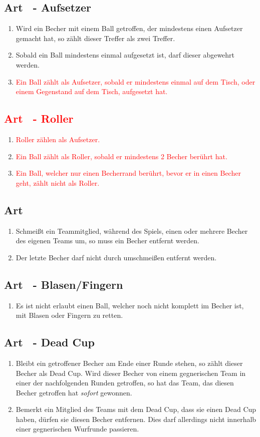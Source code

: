\documentclass[a4paper,11pt]{scrartcl}
\newcommand{\enum}[1]{\begin{enumerate}[label=(\arabic*)]#1\end{enumerate}}
\newcommand{\art}[2]{\subsection*{#1} \enum{#2}}
\newcommand{\quot}[1]{\glqq #1\grqq}
\newcommand{\new}[1]{\textcolor{red}{#1}}
\newcounter{art}
\begin{document}
    \art{Art \theart\ - Aufsetzer}{
        \item
            Wird ein Becher mit einem Ball getroffen, der mindestens einen Aufsetzer gemacht hat, so zählt dieser Treffer als zwei Treffer.
        \item
            Sobald ein Ball mindestens einmal aufgesetzt ist, darf dieser abgewehrt werden.
        \item
            \new{Ein Ball zählt als Aufsetzer, sobald er mindestens einmal auf dem Tisch, oder einem Gegenstand auf dem Tisch, aufgesetzt hat.}
    }

    \art{\new{Art \theart\ - Roller}}{
        \item
            \new{Roller zählen als Aufsetzer.}
        \item
            \new{Ein Ball zählt als Roller, sobald er mindestens 2 Becher berührt hat.}
        \item
            \new{Ein Ball, welcher nur einen Becherrand berührt, bevor er in einen Becher geht, zählt nicht als Roller.}
    }

    \art{Art \theart}{
        \item
            Schmeißt ein Teammitglied, während des Spiels, einen oder mehrere Becher des eigenen Teams um, so muss ein Becher entfernt werden.
        \item
            Der letzte Becher darf nicht durch umschmeißen entfernt werden.
    }

    \art{Art \theart\ - \quot{Blasen/Fingern}}{
        \item
            Es ist nicht erlaubt einen Ball, welcher noch nicht komplett im Becher ist, mit \quot{Blasen} oder \quot{Fingern} zu retten.
    }

    \art{Art \theart\ - \quot{Dead Cup}}{
        \item
            Bleibt ein getroffener Becher am Ende einer Runde stehen, so zählt dieser Becher als \quot{Dead Cup}. Wird dieser Becher von einem gegnerischen Team in einer der nachfolgenden Runden getroffen, so hat das Team, das diesen Becher getroffen hat \emph{sofort} gewonnen.
        \item
            Bemerkt ein Mitglied des Teams mit dem \quot{Dead Cup}, dass sie einen \quot{Dead Cup} haben, dürfen sie diesen Becher entfernen. Dies darf allerdings nicht innerhalb einer gegnerischen Wurfrunde passieren.
    }
\end{document}
